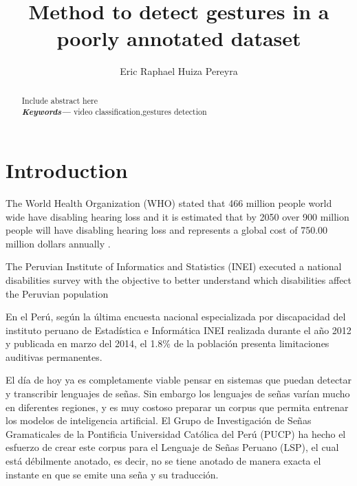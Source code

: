 \documentclass[twocolumn]{article}
\providecommand{\keywords}[1]
{
  \small	
  \textbf{\textit{Keywords---}} #1
}
\begin{document}
\author[1]{Eric Raphael Huiza Pereyra}

\title{\vspace{-2.0cm}\textbf{Method to detect gestures in a poorly annotated dataset}}

\maketitle
    
\begin{abstract}
Include abstract here \\
\keywords{video classification,gestures detection}
\end{abstract}

\section{Introduction}

The World Health Organization (WHO) stated that 466 million people world wide have disabling hearing loss and it is estimated that by 2050 over 900 million people will have disabling hearing loss and represents a global cost of 750.00 million dollars annually  \cite{deafness_and_hearing_loss_2019}. 

The Peruvian Institute of Informatics and Statistics (INEI) executed a national disabilities survey with the objective to better understand which disabilities affect the Peruvian population  

En el Perú, según la última encuesta nacional especializada por discapacidad del instituto peruano de Estadística e Informática INEI realizada durante el año 2012 y publicada en marzo del 2014, el 1.8\% de la población presenta limitaciones auditivas permanentes.

El día de hoy ya es completamente viable pensar en sistemas que puedan detectar y transcribir lenguajes de señas. Sin embargo los lenguajes de señas varían mucho en diferentes regiones, y es muy costoso preparar un corpus que permita entrenar los modelos de inteligencia artificial. El Grupo de Investigación de Señas Gramaticales de la Pontificia Universidad Católica del Perú (PUCP) ha hecho el esfuerzo de crear este corpus para el Lenguaje de Señas Peruano (LSP), el cual está débilmente anotado, es decir, no se tiene anotado de manera exacta el instante en que se emite una seña y su traducción.
\end{document}
